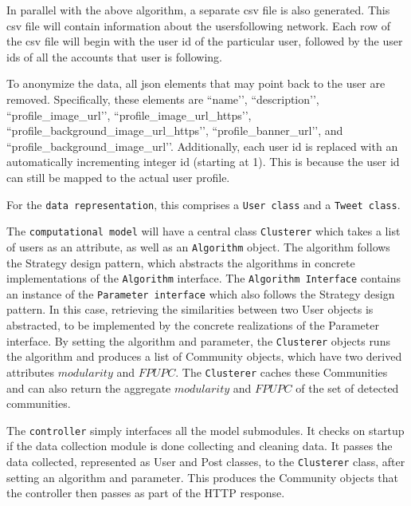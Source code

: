 In parallel with the above algorithm, a separate csv file is also generated. This csv file will contain information about the users\vtick following network. Each row of the csv file will begin with the user id of the particular user, followed by the user id\vtick s of all the accounts that user is following.








To anonymize the data, all json elements that may point back to the user are removed. Specifically, these elements are ``name’’, ``description’’, ``profile\_image\_url’’, ``profile\_image\_url\_https’’, ``profile\_background\_image\_url\_https’’, ``profile\_banner\_url’’, and ``profile\_background\_image\_url’’. Additionally, each user id is replaced with an automatically incrementing integer id (starting at 1). This is because the user id can still be mapped to the actual user profile.








For the \texttt{data representation}, this comprises a \texttt{User class} and a \texttt{Tweet class}.




The \texttt{computational model} will have a central class \texttt{Clusterer} which takes a list of users as an attribute, 
as well as an \texttt{Algorithm} object. The algorithm follows the Strategy design pattern, which abstracts the algorithms in
concrete implementations of the \texttt{Algorithm} interface. The \texttt{Algorithm Interface} contains an instance of the \texttt{Parameter interface}
which also follows the Strategy design pattern. In this case, retrieving the similarities between two User objects is abstracted,
to be implemented by the concrete realizations of the Parameter interface. By setting the algorithm and parameter, the \texttt{Clusterer} objects 
runs the algorithm and produces a list of Community objects, which have two derived attributes $modularity$ and $FPUPC$. The \texttt{Clusterer} caches
these Communities and can also return the aggregate $modularity$ and $FPUPC$ of the set of detected communities.




The \texttt{controller} simply interfaces all the model submodules. It checks on startup if the data collection module is done collecting and cleaning data. It passes the data collected, represented as User and Post classes, to the \texttt{Clusterer} class, after setting an algorithm and parameter. This produces the Community objects that the controller then passes as part of the HTTP response.




